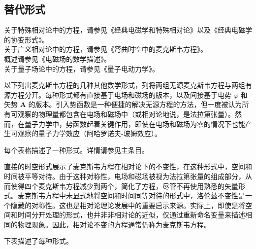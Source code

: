\subsection{替代形式}
 关于特殊相对论中的方程，请参见《经典电磁学和特殊相对论》以及《经典电磁学的协变形式》。\\
 关于广义相对论中的方程，请参见《弯曲时空中的麦克斯韦方程》。\\
 概述请参见《电磁场的数学描述》。\\
 关于量子场论中的方程，请参见《量子电动力学》。

以下列出麦克斯韦方程的几种其他数学形式，列将两组无源麦克斯韦方程与两组有源方程分开。每种形式都有直接基于电场和磁场的版本，以及间接基于电势 \(\varphi\) 和矢势 \(\mathbf{A}\) 的版本。引入势函数是一种便捷的解决无源方程的方法，但一度被认为所有可观察的物理量都包含在电场和磁场中（或相对论地说，是法拉第张量）。然而，在量子力学中，势函数起着关键作用，即使在电场和磁场为零的情况下也能产生可观察的量子力学效应（阿哈罗诺夫-玻姆效应）。

每个表格描述了一种形式。详情请参见主条目。

直接的时空形式展示了麦克斯韦方程在相对论下的不变性，在这种形式中，空间和时间被平等对待。由于这种对称性，电场和磁场被视为法拉第张量的组成部分，从而使得四个麦克斯韦方程减少到两个，简化了方程，尽管不再使用熟悉的矢量形式。麦克斯韦方程中未显式地将空间和时间同等对待的形式中，洛伦兹不变性是一个隐藏的对称性。这也是相对论理论发展中的重要启示来源。实际上，即使是将空间和时间分开处理的形式，也并非非相对论的近似，仅通过重新命名变量来描述相同的物理现象。因此，相对论不变的方程通常仍称为麦克斯韦方程。

下表描述了每种形式。

